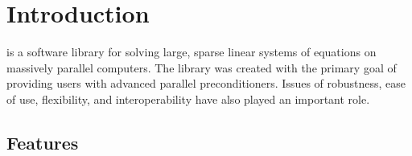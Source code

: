 

\chapter{Introduction}
\label{Introduction}

\hypre{} is a software library for solving large, sparse linear
systems of equations on massively parallel computers.  The library was
created with the primary goal of providing users with advanced
parallel preconditioners.  Issues of robustness, ease of use,
flexibility, and interoperability have also played an important role.


\section{Features}
\label{Features}

